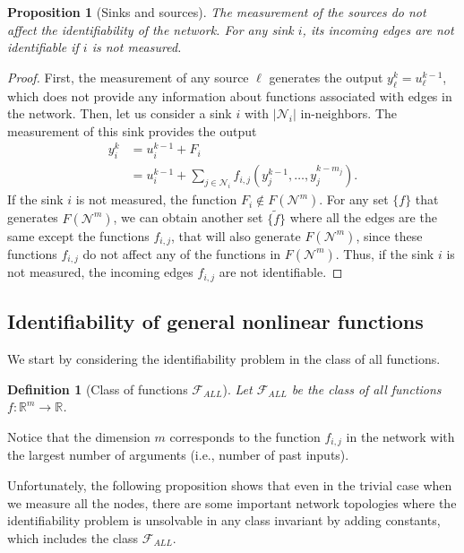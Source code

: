\documentclass[letterpaper,10pt,journal]{IEEEtran}
\newcommand{\Fzero}{\mathcal{F}_{ALL}}
\newtheorem{definition}{Definition}
\newtheorem{proposition}{Proposition}
\newcommand{\abs}[1]{\left|#1\right|}
\newcommand{\R}{\mathbb R}
\newcommand{\NN}{\mathcal{N}}
\newcommand{\aNN}{\abs{\mathcal{N}_i}}
\begin{document}
\begin{proposition}[Sinks and sources]\label{prop:sinks_sources}
The measurement of the sources do not affect the identifiability of the network. For any sink $i$, its incoming edges are not identifiable if $i$ is not measured.


\end{proposition}
\begin{proof}
First, the measurement of any source $\ell$ generates the output $y_\ell^k=u_\ell^{k-1}$, which does not provide any information about functions associated with edges in the network. Then, let us consider a sink $i$ with $\aNN$ in-neighbors. The measurement of this sink provides the output
\begin{align*}
y_i^k&=u_i^{k-1}+F_i\\
&=u_i^{k-1}+\sum_{j\in\NN_i}f_{i,j}(y_j^{k-1},\ldots,y_j^{k-m_j}).  
\end{align*}
If the sink $i$ is not measured, the function $F_i\not\in F(\NN^m)$. For any set $\{ f \}$ that generates $F(\NN^m)$, we can obtain another set $\{ \tilde f \}$ where all the edges are the same except the functions $f_{i,j}$, that will also generate $F(\NN^m)$, since these functions $f_{i,j}$ do not affect any of the functions in $F(\NN^m)$. Thus, if the sink $i$ is not measured, the incoming edges $f_{i,j}$ are not identifiable.
\end{proof}


\subsection{Identifiability of general nonlinear functions}

We start by considering the identifiability problem in the class of all functions.

\begin{definition}[Class of functions $\Fzero$]
Let $\Fzero$ be the class of all  functions $f:\R^m\to\R$.
\end{definition}

Notice that the dimension $m$ corresponds to the function $f_{i,j}$ in the network with the largest number of arguments (i.e., number of past inputs).



Unfortunately, the following proposition shows that even in the trivial case when we measure all the nodes, there are some important network topologies where the identifiability problem is unsolvable in any class invariant by adding constants, which includes the class $\Fzero$. 
\end{document}

